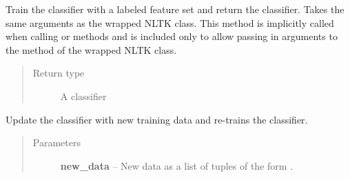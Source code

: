 \documentclass[letterpaper,10pt,english]{sphinxmanual}
\begin{document}
\begin{fulllineitems}
\begin{fulllineitems}
\end{fulllineitems}


\begin{fulllineitems}
\label{api_reference:textblob.classifiers.NLTKClassifier.train}
Train the classifier with a labeled feature set and return
the classifier. Takes the same arguments as the wrapped NLTK class.
This method is implicitly called when calling  or
 methods and is included only to allow passing in arguments
to the  method of the wrapped NLTK class.

\begin{quote}\begin{description}
\item[{Return type}] \leavevmode
A classifier

\end{description}\end{quote}

\end{fulllineitems}


\begin{fulllineitems}
\label{api_reference:textblob.classifiers.NLTKClassifier.update}
Update the classifier with new training data and re-trains the
classifier.
\begin{quote}\begin{description}
\item[{Parameters}] \leavevmode
\textbf{new\_data} -- New data as a list of tuples of the form
.

\end{description}\end{quote}

\end{fulllineitems}


\end{fulllineitems}

\end{document}
